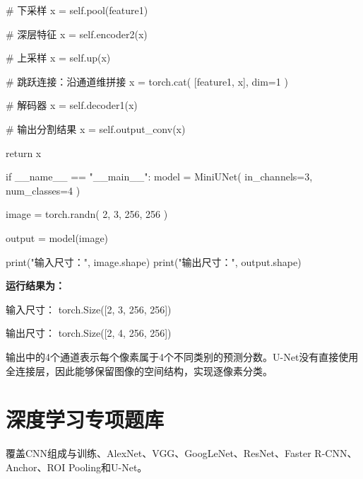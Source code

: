 \documentclass[UTF8,openany,oneside,zihao=-4,fontset=windows]{ctexbook}
\newcommand{\ChapterIntro}[1]{%
  \begin{tcolorbox}[colback=MVLight,colframe=MVBlue!50,boxrule=0.5pt,arc=1.5mm,left=2mm,right=2mm,top=1.5mm,bottom=1.5mm]
  \small #1
  \end{tcolorbox}
}
\begin{document}
\begin{CodeBlock}
        # 下采样
        x = self.pool(feature1)

        # 深层特征
        x = self.encoder2(x)

        # 上采样
        x = self.up(x)

        # 跳跃连接：沿通道维拼接
        x = torch.cat(
            [feature1, x],
            dim=1
        )

        # 解码器
        x = self.decoder1(x)

        # 输出分割结果
        x = self.output_conv(x)

        return x

if __name__ == "__main__":
    model = MiniUNet(
        in_channels=3,
        num_classes=4
    )

    image = torch.randn(
        2,
        3,
        256,
        256
    )

    output = model(image)

    print("输入尺寸：", image.shape)
    print("输出尺寸：", output.shape)
\end{CodeBlock}
\par\noindent\textbf{运行结果为：}
\par 输入尺寸： torch.Size([2, 3, 256, 256])
\par 输出尺寸： torch.Size([2, 4, 256, 256])
\par 输出中的4个通道表示每个像素属于4个不同类别的预测分数。U-Net没有直接使用全连接层，因此能够保留图像的空间结构，实现逐像素分类。
\fi
\chapter{深度学习专项题库}
\ChapterIntro{覆盖CNN组成与训练、AlexNet、VGG、GoogLeNet、ResNet、Faster R-CNN、Anchor、ROI Pooling和U-Net。}
\end{document}
